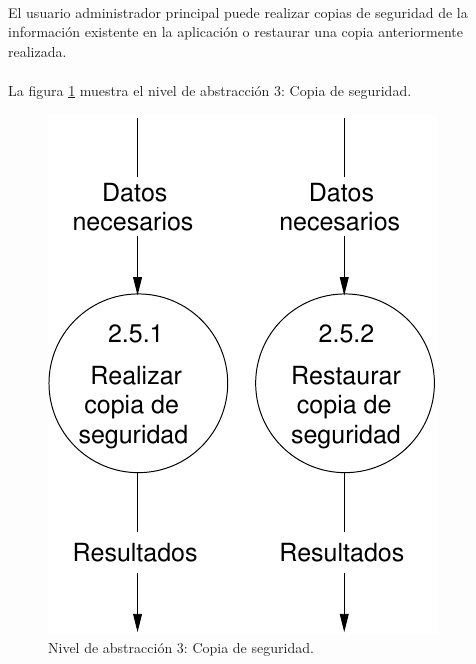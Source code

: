 \paragraph{}El usuario administrador principal puede realizar copias de
seguridad de la información existente en la aplicación o restaurar una copia
anteriormente realizada.

\paragraph{}La figura \ref{diagramaNivel3-CopiaSeguridad}
muestra el nivel de abstracción 3: Copia de seguridad.

  \begin{figure}[!ht]
    \begin{center}
      \includegraphics[]{08.Analisis_Funcional/8.2.DFDs/Niveles/Nivel3/AdministradorPrincipal/CopiaSeguridad/Diagramas/nivel3-CopiaSeguridad.pdf}
      \caption{Nivel de abstracción 3: Copia de seguridad.}
      \label{diagramaNivel3-CopiaSeguridad}
    \end{center}
  \end{figure}

